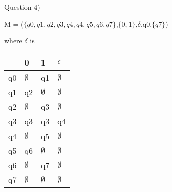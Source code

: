 \documentclass{article}
\begin{document}
Question 4)

\vspace{0.5cm}
M = ($\{q0,q1,q2,q3,q4,q4,q5,q6,q7\}$,$\{0,1\}$,$\delta$,q0,$\{q7\}$)

where $\delta$ is 

\begin{center}
    \begin{tabular}{| l | l | l | l |}
    \hline
       & 0               & 1            & $\epsilon$   \\ \hline
    q0 & $\emptyset$     & q1           & $\emptyset$  \\ \hline
    q1 & q2              & $\emptyset$  & $\emptyset$  \\ \hline
    q2 & $\emptyset$     & q3           & $\emptyset$  \\ \hline
    q3 & q3              & q3           & q4           \\ \hline
    q4 & $\emptyset$     & q5           & $\emptyset$  \\ \hline
    q5 & q6              & $\emptyset$  & $\emptyset$  \\ \hline
    q6 & $\emptyset$     & q7           & $\emptyset$  \\ \hline
    q7 & $\emptyset$     & $\emptyset$  & $\emptyset$  \\
    \hline
    \end{tabular}
\end{center}
\end{document}
